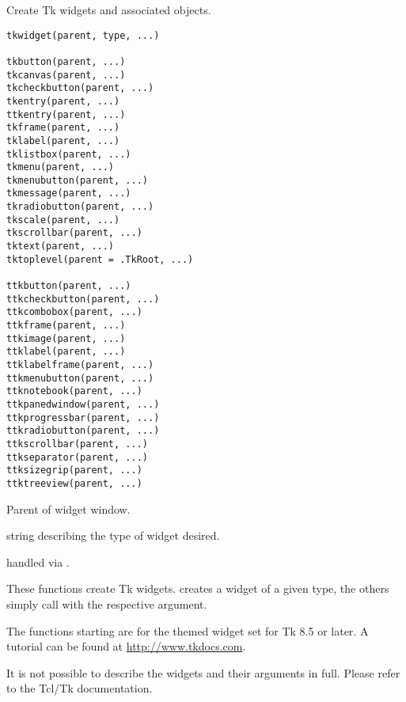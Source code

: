 %
\begin{Description}\relax
Create Tk widgets and associated \R{} objects.
\end{Description}
%
\begin{Usage}
\begin{verbatim}
tkwidget(parent, type, ...)

tkbutton(parent, ...)
tkcanvas(parent, ...)
tkcheckbutton(parent, ...)
tkentry(parent, ...)
ttkentry(parent, ...)
tkframe(parent, ...)
tklabel(parent, ...)
tklistbox(parent, ...)
tkmenu(parent, ...)
tkmenubutton(parent, ...)
tkmessage(parent, ...)
tkradiobutton(parent, ...)
tkscale(parent, ...)
tkscrollbar(parent, ...)
tktext(parent, ...)
tktoplevel(parent = .TkRoot, ...)

ttkbutton(parent, ...)
ttkcheckbutton(parent, ...)
ttkcombobox(parent, ...)
ttkframe(parent, ...)
ttkimage(parent, ...)
ttklabel(parent, ...)
ttklabelframe(parent, ...)
ttkmenubutton(parent, ...)
ttknotebook(parent, ...)
ttkpanedwindow(parent, ...)
ttkprogressbar(parent, ...)
ttkradiobutton(parent, ...)
ttkscrollbar(parent, ...)
ttkseparator(parent, ...)
ttksizegrip(parent, ...)
ttktreeview(parent, ...)
\end{verbatim}
\end{Usage}
%
\begin{Arguments}
\begin{ldescription}
\item[\code{parent}] Parent of widget window.
\item[\code{type}] string describing the type of widget desired.
\item[\code{...}] handled via .
\end{ldescription}
\end{Arguments}
%
\begin{Details}\relax
These functions create Tk widgets.   creates a widget of
a given type, the others simply call  with the
respective  argument.

The functions starting  are for the themed widget set for Tk
8.5 or later.  A tutorial can be found at \url{http://www.tkdocs.com}.

It is not possible to describe the widgets and their arguments in
full.  Please refer to the Tcl/Tk documentation.
\end{Details}
